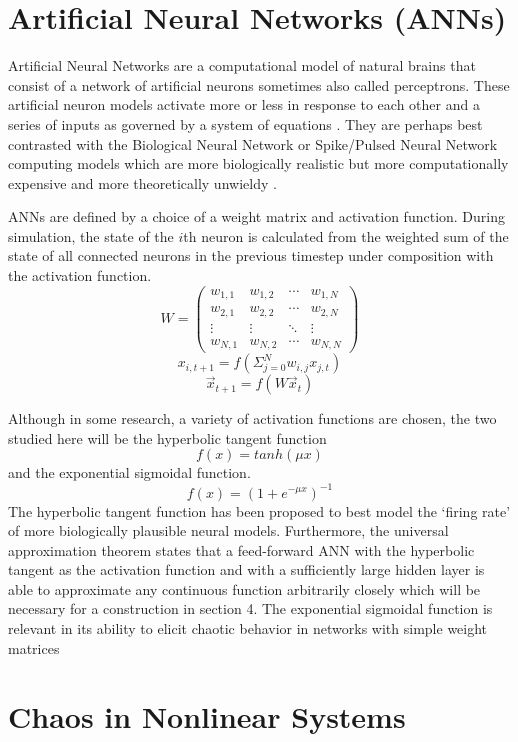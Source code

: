 \documentclass[12pt]{article}
\begin{document}
\section{Artificial Neural Networks (ANNs)}
Artificial Neural Networks are a computational model of natural brains that
consist of a network of artificial neurons sometimes also called perceptrons.
These artificial neuron models activate more or less in response to
each other and a series of inputs as governed by a system of
equations \cite{jaeger_original, doya, dayan}.  They are perhaps best
contrasted with the Biological Neural Network or Spike/Pulsed Neural
Network computing models
which are more biologically realistic but more computationally expensive and
more theoretically unwieldy \cite{maass_book, fitzhugh, izhikevich_book}.

ANNs are defined by a choice of a weight matrix and activation function.
During simulation, the state of the $i$th neuron is calculated from the
weighted sum
of the state of all connected neurons in the previous timestep under
composition with the activation function.
\[ W= \left( \begin{array}{cccc}
             w_{1,1} & w_{1,2} & \cdots & w_{1,N} \\
                  w_{2,1} & w_{2,2} & \cdots & w_{2,N} \\
                       \vdots  & \vdots  & \ddots & \vdots \\
                            w_{N,1} & w_{N,2} & \cdots & w_{N,N} \end{array} \right)\]
$$x_{i,t+1} = f(\Sigma_{j=0}^{N} w_{i,j}x_{j,t})$$
$$\vec{x}_{t+1} = f(W \vec{x}_{t})$$


Although in some research, a variety of activation functions are chosen,
the two studied here will be
the hyperbolic tangent function
$$f(x) = tanh(\mu x)$$
and the exponential sigmoidal function.
$$f(x) = (1 + e^{-\mu x})^{-1}$$
The hyperbolic tangent function has been proposed to best model the
`firing rate'
of more biologically plausible neural models.  Furthermore, the
universal approximation theorem states that a feed-forward ANN with the
hyperbolic tangent as the activation function and with a
sufficiently large hidden layer is able to approximate any continuous function
arbitrarily closely \cite{universal} which will be necessary for a
construction in section 4.  The exponential sigmoidal function is
relevant in its ability to elicit chaotic behavior in networks with simple
weight matrices

\section{Chaos in Nonlinear Systems}
\end{document}
